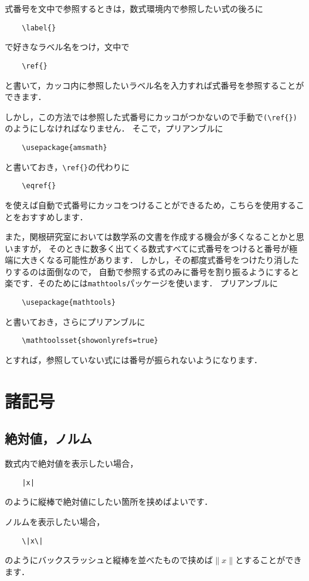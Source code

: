 \documentclass[a4paper,11pt]{jsreport}
\numberwithin{equation}{section}
\theoremstyle{definition}
\begin{document}
式番号を文中で参照するときは，数式環境内で参照したい式の後ろに
\begin{verbatim}
    \label{}
\end{verbatim}
で好きなラベル名をつけ，文中で
\begin{verbatim}
    \ref{}
\end{verbatim}
と書いて，カッコ内に参照したいラベル名を入力すれば式番号を参照することができます．

しかし，この方法では参照した式番号にカッコがつかないので手動で\verb|(\ref{})|のようにしなければなりません．
そこで，プリアンブルに
\begin{verbatim}
    \usepackage{amsmath}
\end{verbatim}
と書いておき，\verb|\ref{}|の代わりに
\begin{verbatim}
    \eqref{}
\end{verbatim}
を使えば自動で式番号にカッコをつけることができるため，こちらを使用することをおすすめします．

また，関根研究室においては数学系の文書を作成する機会が多くなることかと思いますが，
そのときに数多く出てくる数式すべてに式番号をつけると番号が極端に大きくなる可能性があります．
しかし，その都度式番号をつけたり消したりするのは面倒なので，
自動で参照する式のみに番号を割り振るようにすると楽です．そのためには\verb|mathtools|パッケージを使います．
プリアンブルに
\begin{verbatim}
    \usepackage{mathtools}
\end{verbatim}
と書いておき，さらにプリアンブルに
\begin{verbatim}
    \mathtoolsset{showonlyrefs=true}
\end{verbatim}
とすれば，参照していない式には番号が振られないようになります\cite{FomulaNumber}．

\section{諸記号}

\subsection{絶対値，ノルム}

数式内で絶対値を表示したい場合，
\begin{verbatim}
    |x|
\end{verbatim}
のように縦棒で絶対値にしたい箇所を挟めばよいです．

ノルムを表示したい場合，
\begin{verbatim}
    \|x\|
\end{verbatim}
のようにバックスラッシュと縦棒を並べたもので挟めば$\|x\|$とすることができます．
\end{document}
